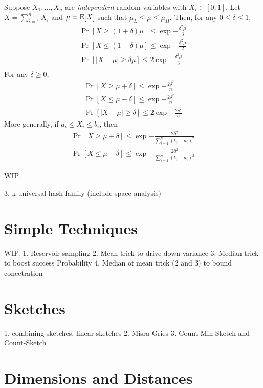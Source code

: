 \documentclass{article}
\begin{document}
\begin{lemma}
  Suppose $X_1, \ldots, X_n$ are \emph{independent} random variables with $X_i \in [0, 1]$.
  Let $X = \sum_{i=1}^n X_i$ and $\mu = \operatorname{E}[X]$ such that $\mu_L \leq \mu \leq \mu_H$.
  Then, for any $0 \leq \delta \leq 1$,
  \begin{align}
    \Pr[X \geq (1 + \delta)\mu] \le \exp{-\frac{\delta^2\mu}{3}}
    \\
    \Pr[X \leq (1 - \delta)\mu] \le \exp{-\frac{\delta^2\mu}{2}}
    \\
    \Pr \left[ |X - \mu| \geq \delta \mu \right] \le 2 \exp{-\frac{\delta^2\mu}{3}}
    \\
  \end{align}
  For any $\delta \geq 0$,
  \begin{align}
    \Pr[X \geq \mu + \delta] \le \exp{-\frac{2\delta^2}{n}}
    \\
    \Pr[X \leq \mu - \delta] \le \exp{-\frac{2\delta^2}{n}}
    \\
    \Pr \left[ |X - \mu| \geq \delta \right] \le 2 \exp{-\frac{2\delta^2}{n}}
  \end{align}
  More generally, if $a_i \leq X_i \leq b_i$, then
  \begin{align}
    \Pr[X \geq \mu + \delta] \le \exp{-\frac{2\delta^2}{\sum_{i=1}^n (b_i - a_i)^2}}
    \\
    \Pr[X \leq \mu - \delta] \le \exp{-\frac{2\delta^2}{\sum_{i=1}^n (b_i - a_i)^2}}
  \end{align}
\end{lemma}

WIP.

3. k-universal hash family (include space analysis)

\section{Simple Techniques}

WIP.
1. Reservoir sampling
2. Mean trick to drive down variance
3. Median trick to boost success Probability
4. Median of mean trick (2 and 3) to bound concetration

\section{Sketches}

1. combining sketches, linear sketches
2. Misra-Gries
3. Count-Min-Sketch and Count-Sketch

\section{Dimensions and Distances}
\end{document}
